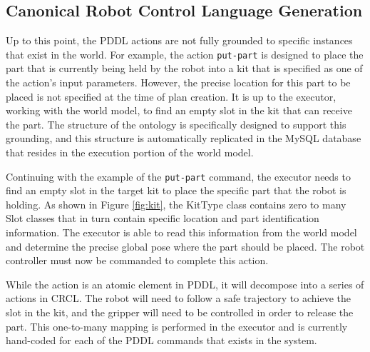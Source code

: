 \subsection{Canonical Robot Control Language Generation}
Up to this point, the PDDL actions are not fully grounded to specific instances
that exist in the world. For example, the action \texttt{put-part} is designed
to place the part that is currently being held by the robot into a kit that
is specified as one of the action's input parameters. However, the precise
location for this part to be placed is not specified at the time of plan
creation. It is up to the executor, working with the world model, to find
an empty slot in the kit that can receive the part. The structure of the
ontology is specifically designed to support this grounding, and this
structure is automatically replicated in the MySQL database that resides
in the execution portion of the world model. 

Continuing with
the example of the \texttt{put-part} command, the executor needs to find
an empty slot in the target kit to place the specific part that the robot is
holding. As shown in Figure \ref{fig:kit}, the {\sc KitType} class contains
zero to many {\sc Slot} classes that in turn contain specific location and 
part identification information. The executor is able to read this information
from the world model and determine the precise global pose where the part
should be placed. The robot controller must now be commanded to complete this action.

While the action is an atomic element in PDDL, it will decompose into a series
of actions in CRCL. The robot will need to follow a safe trajectory to achieve
the slot in the kit, and the gripper will need to be controlled in order to release
the part. This one-to-many mapping is performed in the executor and is currently
hand-coded for each of the PDDL commands that exists in the system. 
%
